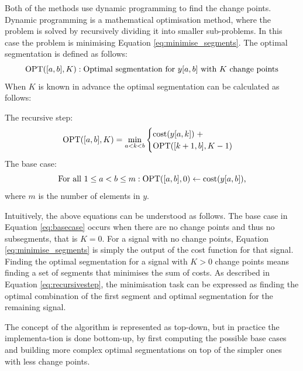 Both of the methods use dynamic programming to find the change points. Dynamic programming is a mathematical optimisation method, where the problem is solved by recursively dividing it into smaller sub-problems. In this case the problem is minimising Equation \ref{eq:minimise_segments}. The optimal segmentation is defined as follows:
\begin{equation}
  \operatorname{OPT}([a,b],K): \text{Optimal segmentation for } y[a,b] \text{ with $K$ change points} 
\label{eq:opt}
\end{equation}
When $K$ is known in advance the optimal segmentation can be calculated as follows:

The recursive step:
\begin{equation}
  \operatorname{OPT}([a,b],K) = \min\limits_{a<k<b}
    \begin{cases}
      \operatorname{cost}(y[a,k]) \hspace{0.1cm}+ \\
      \operatorname{OPT}([k+1,b],K-1)
    \end{cases}
\label{eq:recursivestep}
\end{equation}
The base case:
\begin{equation}
  \text{For all 1} \leq a < b \leq m:
    \operatorname{OPT}([a,b],0) \leftarrow \operatorname{cost}(y[a,b]) \text{,}
\label{eq:basecase}
\end{equation}
where $m$ is the number of elements in $y$.

Intuitively, the above equations can be understood as follows. The base case in Equation \ref{eq:basecase} occurs when there are no change points and thus no subsegments, that is $K=0$. For a signal with no change points, Equation \ref{eq:minimise_segments} is simply the output of the cost function for that signal. Finding the optimal segmentation for a signal with $K > 0$ change points means finding a set of segments that minimises the sum of costs. As described in Equation \ref{eq:recursivestep}, the minimisation task can be expressed as finding the optimal combination of the first segment and optimal segmentation for the remaining signal.

The concept of the algorithm is represented as top-down, but in practice the implementa-tion is done bottom-up, by first computing the possible base cases and building more complex optimal segmentations on top of the simpler ones with less change points.

